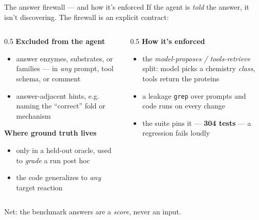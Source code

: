 \documentclass[aspectratio=169,11pt]{beamer}
\newcommand{\hl}[1]{{\color{brand}\textbf{#1}}}
\newcommand{\hlt}[1]{{\color{brand2}\textbf{#1}}}
\newcommand{\hla}[1]{{\color{accent}\textbf{#1}}}
\begin{document}
\begin{frame}{The answer firewall --- and how it's enforced}
  If the agent is \emph{told} the answer, it isn't discovering. The firewall is an
  explicit contract:
  \vspace{0.5em}
  \begin{columns}[T]
    \begin{column}{0.5\textwidth}
      \hla{Excluded from the agent}
      \begin{itemize}\small
        \item answer enzymes, substrates, or families --- in \emph{any} prompt, tool
          schema, or comment
        \item answer-adjacent hints, e.g. naming the ``correct'' fold or mechanism
      \end{itemize}
      \vspace{0.3em}
      \hlt{Where ground truth lives}
      \begin{itemize}\small
        \item only in a held-out oracle, used to \emph{grade} a run post hoc
        \item the code generalizes to \emph{any} target reaction
      \end{itemize}
    \end{column}
    \begin{column}{0.5\textwidth}
      \hl{How it's enforced}
      \begin{itemize}\small
        \item the \emph{model-proposes / tools-retrieve} split: model picks a chemistry
          \emph{class}, tools return the proteins
        \item a leakage \texttt{grep} over prompts and code runs on every change
        \item the suite pins it --- \hl{304 tests} --- a regression fails loudly
      \end{itemize}
    \end{column}
  \end{columns}
  \vspace{0.4em}
  \begin{center}\footnotesize\color{muted}
    Net: the benchmark answers are a \emph{score}, never an input.
  \end{center}
\end{frame}
\end{document}
